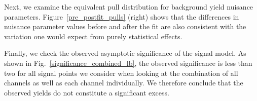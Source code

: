 


Next, we examine the equivalent pull distribution for background yield nuisance parameters. Figure~\ref{pre_postfit_pulls} (right) shows that the differences in nuisance parameter values before and after the fit are also consistent with the variation one would expect from purely statistical effects.

Finally, we check the observed asymptotic significance of the \stoptolb signal model. As shown in Fig.~\ref{significance_combined_lb}, the observed significance is less than two for all signal points we consider when looking at the combination of all channels as well as each channel individually. We therefore conclude that the observed yields do not constitute a significant excess.



\pagebreak